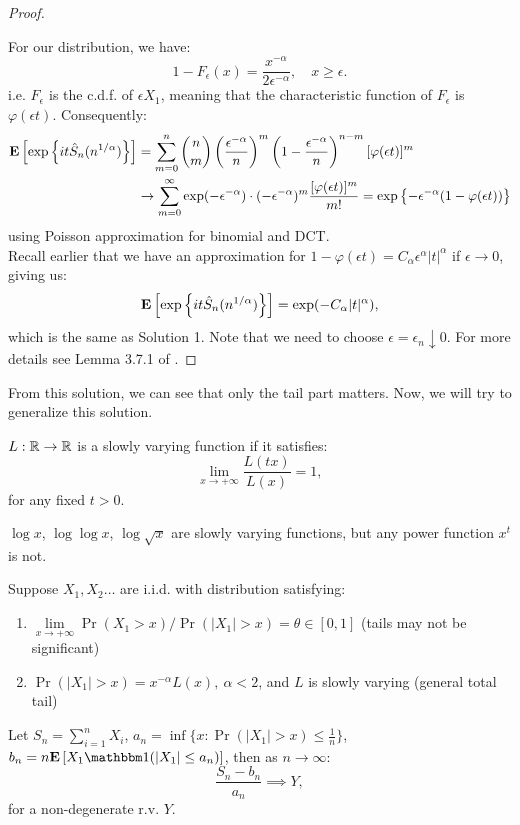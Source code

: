 \documentclass[../main/main.tex]{subfiles}
\begin{document}
\begin{proof}
\begin{enumerate}
	\end{enumerate}
	\vspace*{-1em}
	For our distribution, we have: \[
		1- F_{\epsilon}(x) = \frac{x^{-\alpha}}{2 \epsilon^{-\alpha}}, \quad x \geq \epsilon.
	\]
	i.e. $F_{\epsilon}$ is the c.d.f. of $\epsilon X_1$, meaning that the characteristic function of $F_{\epsilon}$ is $\varphi(\epsilon t)$. Consequently:
	\begin{align*}
		\text{\textbf{E}} \left[ \exp \left\{it \hat{S}_n(n^{1 / \alpha})\right\} \right] & = \sum\limits_{m=0}^{n} \binom{n}{m} \left( \frac{\epsilon^{-\alpha}}{n} \right)^{m} \left( 1- \frac{\epsilon^{-\alpha}}{n} \right)^{n-m}[\varphi(\epsilon t)]^{m} \\
		                                                                   & \to  \sum\limits_{m=0}^{\infty} \exp(-\epsilon^{-\alpha}) \cdot (-\epsilon^{-\alpha})^{m} \frac{[\varphi(\epsilon t)]^{m}}{m!}
		= \exp \left\{
		-\epsilon^{-\alpha}(1-\varphi(\epsilon t))                   \right\}
	\end{align*}
	using Poisson approximation for binomial and DCT.\\

	Recall earlier that we have an approximation for $1-\varphi(\epsilon t) = C_{\alpha}\epsilon^{\alpha}|t|^{\alpha}$ if $\epsilon \to 0$, giving us: \[
		\text{\textbf{E}} \left[ \exp \left\{it \hat{S}_n(n^{1 / \alpha})\right\} \right] = \exp(-C_{\alpha}|t|^{\alpha}),
	\] which is the same as Solution 1. Note that we need to choose $\epsilon = \epsilon_n \downarrow 0$. For more details see Lemma 3.7.1 of \cite{Dur19}.
\end{proof}

From this solution, we can see that only the tail part matters. Now, we will try to generalize this solution.

\begin{definition}
	$L:\mathbb{R} \to \mathbb{R}$ is a slowly varying function if it satisfies: \[
		\lim\limits_{x\to+\infty} \frac{L(tx)}{L(x)}=1,
	\] for any fixed $t > 0$.
\end{definition}
\begin{example}
	$\log x$, $\log \log x$, $\log \sqrt{x}$ are slowly varying functions, but any power function $x^{t}$ is not.
\end{example}

\begin{theorem}\label{210:th1}
	Suppose $X_{1}, X_2\ldots$ are i.i.d. with distribution satisfying:
	\begin{enumerate}[label=(\roman*)]
		\item $\lim\limits_{x\to+\infty} \Pr(X_1 > x) / \Pr(|X_1| > x) = \theta \in [0,1]$ (tails may not be significant)
		\item $\Pr(|X_1| > x) = x^{-\alpha} L(x),\ \alpha<2$, and $L$ is slowly varying (general total tail)
	\end{enumerate}
	Let $S_n = \sum\limits_{i=1}^{n}X_i$, $a_n = \inf \{x: \Pr(|X_1|>x)\leq \frac{1}{n}\}$, $b_n= n \E \left[ X_1 \ind(|X_1|\leq a_n) \right]$, then as $n \to \infty$: \[
		\frac{S_n - b_n}{a_n}\implies Y,
	\] for a non-degenerate r.v. $Y$.
\end{theorem}
\end{document}
